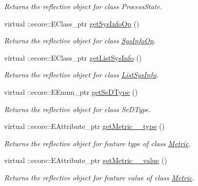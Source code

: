 \begin{DoxyCompactItemize}
\begin{DoxyCompactList}\small\item\em Returns the reflective object for class ProcessState. \item\end{DoxyCompactList}\item 
virtual ::ecore::EClass\_\-ptr \hyperlink{classIMS__Data_1_1IMS__DataPackage_a878128c313362fa536f6976af2ed8f57}{getSysInfoOp} ()
\begin{DoxyCompactList}\small\item\em Returns the reflective object for class \hyperlink{classIMS__Data_1_1SysInfoOp}{SysInfoOp}. \item\end{DoxyCompactList}\item 
virtual ::ecore::EClass\_\-ptr \hyperlink{classIMS__Data_1_1IMS__DataPackage_a8ddee1a590a95906b955a37ffd285a9e}{getListSysInfo} ()
\begin{DoxyCompactList}\small\item\em Returns the reflective object for class \hyperlink{classIMS__Data_1_1ListSysInfo}{ListSysInfo}. \item\end{DoxyCompactList}\item 
virtual ::ecore::EEnum\_\-ptr \hyperlink{classIMS__Data_1_1IMS__DataPackage_a92b38f6153aef94de501c2390ae99b94}{getSeDType} ()
\begin{DoxyCompactList}\small\item\em Returns the reflective object for class SeDType. \item\end{DoxyCompactList}\item 
virtual ::ecore::EAttribute\_\-ptr \hyperlink{classIMS__Data_1_1IMS__DataPackage_a2f04aaa9762578d57b998f4b8973f728}{getMetric\_\-\_\-type} ()
\begin{DoxyCompactList}\small\item\em Returns the reflective object for feature type of class \hyperlink{classIMS__Data_1_1Metric}{Metric}. \item\end{DoxyCompactList}\item 
virtual ::ecore::EAttribute\_\-ptr \hyperlink{classIMS__Data_1_1IMS__DataPackage_ad12e8f0cb96f9610ebd2e1fd4d4bf0db}{getMetric\_\-\_\-value} ()
\begin{DoxyCompactList}\small\item\em Returns the reflective object for feature value of class \hyperlink{classIMS__Data_1_1Metric}{Metric}. \item\end{DoxyCompactList}\item 

\end{DoxyCompactItemize}
